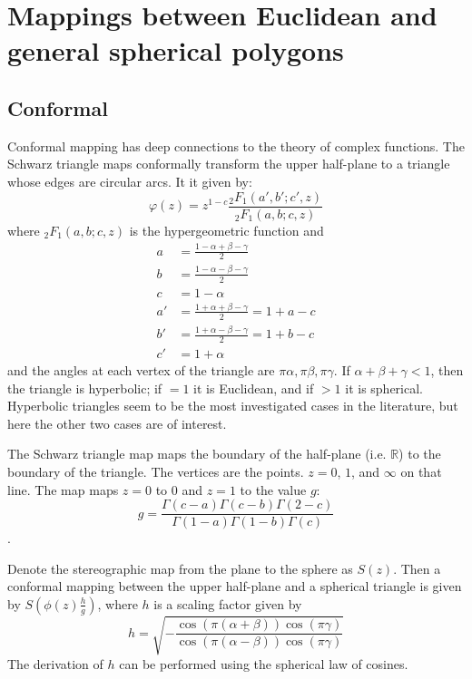 \documentclass{amsart}[12pt]
\begin{document}
\section{Mappings between Euclidean and general spherical polygons}
\subsection{Conformal}
Conformal mapping has deep connections to the theory of complex functions.
The Schwarz triangle maps conformally transform the upper half-plane to a
triangle whose edges are circular arcs. It it given by:
\begin{equation}
   \varphi(z) = z^{1-c} \frac{_2 F_1(a',b';c',z)}{_2 F_1(a,b;c,z)}
\end{equation}
where $_2 F_1(a,b;c,z)$ is the hypergeometric function and
\begin{equation}\begin{split}
   a & = \frac{1 - \alpha + \beta - \gamma}{2}\\
   b & = \frac{1 - \alpha - \beta - \gamma}{2}\\
   c & = 1 - \alpha\\
   a' &= \frac{1 + \alpha + \beta - \gamma}{2} = 1 + a - c\\
   b' &= \frac{1 + \alpha - \beta - \gamma}{2} = 1 + b - c\\
   c' &= 1 + \alpha
\end{split}\end{equation}
and the angles at each vertex of the triangle are $\pi \alpha, \pi \beta,
\pi \gamma$. If $\alpha + \beta + \gamma < 1$, then the triangle is hyperbolic;
if $=1$ it is Euclidean, and if $>1$ it is spherical. \cite{nehari} Hyperbolic
triangles seem to be the most investigated cases in the literature, but here the
other two cases are of interest.

The Schwarz triangle map maps the boundary of the half-plane (i.e. $\mathbb{R}$)
to the boundary of the triangle. The vertices are the points. $z=0$, $1$, and
$\infty$ on that line. The map maps $z=0$ to $0$ and $z=1$ to the value $g$:
\begin{equation}
  g = \frac{\Gamma(c-a)\Gamma(c-b)\Gamma(2-c)}{\Gamma(1-a)\Gamma(1-b)\Gamma(c)}
\end{equation}.

Denote the stereographic map from the plane to the sphere as $S(z)$. Then a
conformal mapping between the upper half-plane and a spherical triangle is
given by $S\left(\phi(z)\frac{h}{g}\right)$, where $h$ is a scaling factor
given by
\begin{equation}
  h = \sqrt{ -\frac{\cos \left(\pi (\alpha+\beta)\right)
                    \cos\left(\pi\gamma\right)}
                   {\cos \left(\pi (\alpha-\beta)\right)
                    \cos\left(\pi\gamma\right)}}
\end{equation}
The derivation of $h$ can be performed using the spherical law of cosines.
\end{document}
